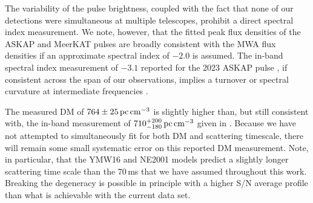\documentclass[fleqn,usenatbib]{mnras}
\begin{document}
The variability of the pulse brightness, coupled with the fact that none of our detections were simultaneous at multiple telescopes, prohibit a direct spectral index measurement.
We note, however, that the fitted peak flux densities of the ASKAP and MeerKAT pulses are broadly consistent with the MWA flux densities if an approximate spectral index of $-2.0$ is assumed.
The in-band spectral index measurement of $-3.1$ reported for the 2023 ASKAP pulse , if consistent across the span of our observations, implies a turnover or spectral curvature at intermediate frequencies \citep[perhaps comparable with GPM\,1839$-$10][]{2023Natur.619..487H}.

The measured DM of $764 \pm 25\,{\rm pc}\,{\rm cm}^{-3}$ is slightly higher than, but still consistent with, the in-band measurement of $710^{+200}_{-180}\,{\rm pc}\,{\rm cm}^{-3}$ given in .
Because we have not attempted to simultaneously fit for both DM and scattering timescale, there will remain some small systematic error on this reported DM measurement.
Note, in particular, that the YMW16 and NE2001 models predict a slightly longer scattering time scale than the $70\,$ms that we have assumed throughout this work.
Breaking the degeneracy is possible in principle with a higher S/N average profile than what is achievable with the current data set.
\end{document}
